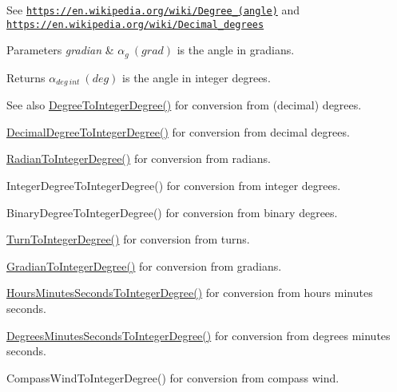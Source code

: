 See \href{https://en.wikipedia.org/wiki/Degree_(angle)}{\tt https\+://en.\+wikipedia.\+org/wiki/\+Degree\+\_\+(angle)} and \href{https://en.wikipedia.org/wiki/Decimal_degrees}{\tt https\+://en.\+wikipedia.\+org/wiki/\+Decimal\+\_\+degrees} 
\begin{DoxyParams}{Parameters}
{\em gradian} & $\alpha_{g}\ (grad)$ is the angle in gradians. \\
\hline
\end{DoxyParams}
\begin{DoxyReturn}{Returns}
$\alpha_{deg\ int}\ (deg)$ is the angle in integer degrees. 
\end{DoxyReturn}
\begin{DoxySeeAlso}{See also}
\mbox{\hyperlink{group___e_g_x_math-_conversions-_angle_conversions-_degree_gaabd20f21be3c18ee423d0bc1a677c6f6}{Degree\+To\+Integer\+Degree()}} for conversion from (decimal) degrees. 

\mbox{\hyperlink{group___e_g_x_math-_conversions-_angle_conversions-_decimal_degree_ga115239ea7202dbc6a6c9fba68e0ac189}{Decimal\+Degree\+To\+Integer\+Degree()}} for conversion from decimal degrees. 

\mbox{\hyperlink{group___e_g_x_math-_conversions-_angle_conversions-_radian_gac84796dfdeb56235e1e338522a5f9350}{Radian\+To\+Integer\+Degree()}} for conversion from radians. 

Integer\+Degree\+To\+Integer\+Degree() for conversion from integer degrees. 

Binary\+Degree\+To\+Integer\+Degree() for conversion from binary degrees. 

\mbox{\hyperlink{group___e_g_x_math-_conversions-_angle_conversions-_turn_ga999085c62490997da870618e20e88ebb}{Turn\+To\+Integer\+Degree()}} for conversion from turns. 

\mbox{\hyperlink{group___e_g_x_math-_conversions-_angle_conversions-_gradian_ga555aae885f8a7d0876a36aa07cbbd816}{Gradian\+To\+Integer\+Degree()}} for conversion from gradians. 

\mbox{\hyperlink{group___e_g_x_math-_conversions-_angle_conversions-_hours_minutes_seconds_gadf3829ca1704cfd64886a4de1b3e366f}{Hours\+Minutes\+Seconds\+To\+Integer\+Degree()}} for conversion from hours minutes seconds. 

\mbox{\hyperlink{group___e_g_x_math-_conversions-_angle_conversions-_degrees_minutes_seconds_ga973287a878e521e3c1d4d1f973ecdcfe}{Degrees\+Minutes\+Seconds\+To\+Integer\+Degree()}} for conversion from degrees minutes seconds. 

Compass\+Wind\+To\+Integer\+Degree() for conversion from compass wind. 
\end{DoxySeeAlso}
\mbox{\label{group___e_g_x_math-_conversions-_angle_conversions-_gradian_gab7781c860ea3ab9c9cf76ab639846a07}} 
